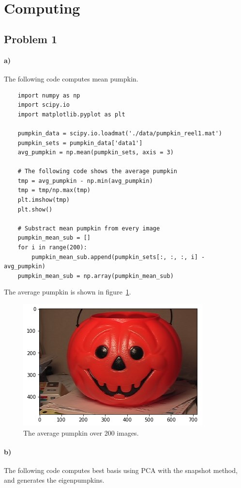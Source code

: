 \documentclass{article}
\begin{document}
\newpage
\section{Computing}
\subsection{Problem 1}


	\paragraph{a)} The following code computes mean pumpkin.
	
	\begin{lstlisting}
	import numpy as np
	import scipy.io
	import matplotlib.pyplot as plt
	
	pumpkin_data = scipy.io.loadmat('./data/pumpkin_reel1.mat')
	pumpkin_sets = pumpkin_data['data1']
	avg_pumpkin = np.mean(pumpkin_sets, axis = 3)
	
	# The following code shows the average pumpkin
	tmp = avg_pumpkin - np.min(avg_pumpkin)
	tmp = tmp/np.max(tmp)
	plt.imshow(tmp)
	plt.show()
	
	# Substract mean pumpkin from every image
	pumpkin_mean_sub = []
	for i in range(200):
		pumpkin_mean_sub.append(pumpkin_sets[:, :, :, i] - avg_pumpkin)
	pumpkin_mean_sub = np.array(pumpkin_mean_sub)
	\end{lstlisting}
	
	The average pumpkin is shown in figure~\ref{fig:avg_pumpkin}.
	
	\begin{figure}[h!]
	\centering
	\includegraphics[width=0.6\linewidth]{images/1_a.png}
	\caption{The average pumpkin over 200 images.}
	\label{fig:avg_pumpkin}
	\end{figure}
	
	
	\paragraph{b)} The following code computes best basis using PCA with the snapshot method, and generates the eigenpumpkins. 
	
\end{document}
